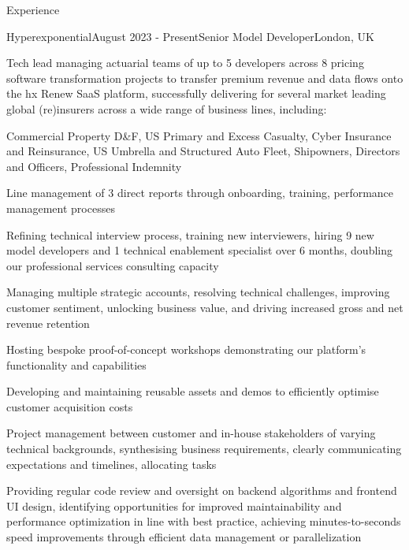 \documentclass{resume} %
\begin{document}

\begin{rSection}{Experience}

\begin{rSubsection}{Hyperexponential}{August 2023 - Present}{Senior Model Developer}{London, UK}
	\item Tech lead managing actuarial teams of up to 5 developers across 8 pricing software transformation projects to transfer premium revenue and data flows onto the hx Renew SaaS platform, successfully delivering for several market leading global (re)insurers across a wide range of business lines, including:
	\item Commercial Property D\&F, US Primary and Excess Casualty, Cyber Insurance and Reinsurance, US Umbrella and Structured Auto Fleet, Shipowners, Directors and Officers, Professional Indemnity
	\item Line management of 3 direct reports through onboarding, training, performance management processes
    \item Refining technical interview process, training new interviewers, hiring 9 new model developers and 1 technical enablement specialist over 6 months, doubling our professional services consulting capacity
    \item Managing multiple strategic accounts, resolving technical challenges, improving customer sentiment, unlocking business value, and driving increased gross and net revenue retention
	\item Hosting bespoke proof-of-concept workshops demonstrating our platform's functionality and capabilities
    \item Developing and maintaining reusable assets and demos to efficiently optimise customer acquisition costs
    \item Project management between customer and in-house stakeholders of varying technical backgrounds, synthesising business requirements, clearly communicating expectations and timelines, allocating tasks
    \item Providing regular code review and oversight on backend algorithms and frontend UI design, identifying opportunities for improved maintainability and performance optimization in line with best practice, achieving minutes-to-seconds speed improvements through efficient data management or parallelization
\end{rSubsection}


\end{rSection}
\end{document}
